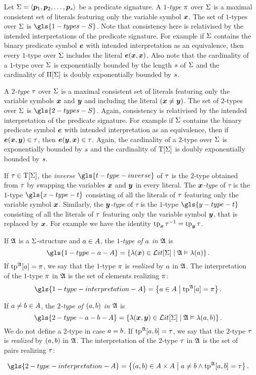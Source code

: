Let $\mathrm{\Sigma} = \left\langle \bm{p}_{1}, \bm{p}_{2}, \dots, \bm{p}_{s} \right\rangle$ be a predicate signature.
A \emph{$1$-type} $\pi$ over $\mathrm{\Sigma}$ is a maximal consistent set of literals
featuring only the variable symbol $\bm{x}$.
The set of $1$-types over $\mathrm{\Sigma}$ is $\gls{1-types-S}$.
Note that consistency here is relativised by the intended interpretations of the
predicate signature. For example if $\mathrm{\Sigma}$ contains the binary predicate symbol
$\bm{e}$ with intended interpretation as an equivalence, then every $1$-type over
$\mathrm{\Sigma}$ includes the literal $\bm{e}(\bm{x},\bm{x})$.
Also note that the cardinality of a $1$-type over $\mathrm{\Sigma}$ is exponentially
bounded by the length $s$ of $\mathrm{\Sigma}$ and the cardinality of $\Pi[\mathrm{\Sigma}]$ is
doubly exponentially bounded by $s$.

A \emph{$2$-type} $\tau$ over $\mathrm{\Sigma}$ is a maximal consistent set of literals
featuring only the variable symbols $\bm{x}$ and $\bm{y}$ and including the literal
$(\bm{x} \neq \bm{y})$.
The set of $2$-types over $\mathrm{\Sigma}$ is $\gls{2-types-S}$.
Again, consistency is relativised by the intended interpretation of the
predicate signature. For example if $\mathrm{\Sigma}$ contains the binary predicate symbol
$\bm{e}$ with intended interpretation as an equivalence, then if $\bm{e}(\bm{x}, \bm{y}) \in
\tau$, then $\bm{e}(\bm{y}, \bm{x}) \in \tau$.
Again, the cardinality of a $2$-type over $\mathrm{\Sigma}$ is exponentially bounded by
$s$ and the cardinality of $\mathrm{T}[\mathrm{\Sigma}]$ is doubly exponentially bounded by
$s$.

If $\tau \in \mathrm{T}[\mathrm{\Sigma}]$, the \emph{inverse} $\gls{t-type-inverse}$ of $\tau$
is the $2$-type obtained from $\tau$ by
swapping the variables $\bm{x}$ and $\bm{y}$ in every literal.
The \emph{$\bm{x}$-type} of $\tau$ is the $1$-type $\gls{x-type-t}$
consisting of all the literals of $\tau$ featuring only the variable symbol
$\bm{x}$. Similarly, the \emph{$\bm{y}$-type} of $\tau$ is the $1$-type
$\gls{y-type-t}$ consisting of all the literals of $\tau$ featuring only the
variable symbol $\bm{y}$, that is replaced by $\bm{x}$.
For example we have the identity $\operatorname{tp}_{\bm{x}}\tau^{-1} = \operatorname{tp}_{\bm{y}}\tau$.

If $\mathfrak{A}$ is a $\mathrm{\Sigma}$-structure and $a \in A$, the \emph{$1$-type of
$a$ in $\mathfrak{A}$} is
\[
  \gls{1-type-a-A} = \setbd{\litl(\xx) \in \LitF\sigS}{\StrA \vDash \litl(\ea)}.
\]
If $\operatorname{tp}^{\mathfrak{A}}[a] = \pi$, we say that the $1$-type $\pi$ is \emph{realized}
by $a$ in $\mathfrak{A}$. The interpretation of the $1$-type $\pi$ in $\mathfrak{A}$ is
the set of elements realizing $\pi$:
\[
  \gls{1-type-interpretation-A} = \setbd{\ea \in \domA}{\tpIa\StrA\ea = \tpIp}.
\]

If $a \neq b \in A$, the \emph{$2$-type of $(a, b)$ in $\mathfrak{A}$} is
\[
  \gls{2-type-a-b-A} = \setbd{\litl(\xx,\yy) \in \LitF\sigS}{\StrA \vDash
  \litl(\ea, \eb)}.
\]
We do not define a $2$-type in case $a = b$.
If $\operatorname{tp}^{\mathfrak{A}}[a,b] = \tau$, we say that the $2$-type $\tau$ is
\emph{realized} by $(a, b)$ in $\mathfrak{A}$. The interpretation of the $2$-type
$\tau$ in $\mathfrak{A}$ is the set of pairs realizing $\tau$:

\[
  \gls{2-type-interpretation-A} = \setbd{(\ea, \eb) \in
  \domA\cprod\domA}{\ea \neq \eb \land \tpIab\StrA\ea\eb = \tpTt}.
\]
